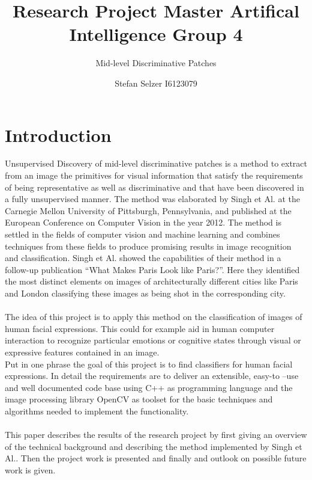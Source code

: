 \documentclass[%
   final,      %
   paper=a4,%
   paper=portrait, %
   pagesize=auto, %
   fontsize=10pt,%
   version=last, %
 ]{scrartcl} %
\title{Research Project Master Artifical Intelligence Group 4}
\subtitle{Mid-level Discriminative Patches}
\author{Stefan Selzer I6123079}
\begin{document}
\maketitle

\newpage
\tableofcontents
\newpage
\section{Introduction}\label{sec:Introduction}
Unsupervised Discovery of mid-level discriminative patches is a method to extract from an image the primitives for visual information that satisfy the requirements of being representative as well as discriminative and that have been discovered in a fully unsupervised manner. The method was elaborated by Singh et Al. at the Carnegie Mellon University of Pittsburgh, Pennsylvania, and published at the European Conference on Computer Vision in the year 2012.\cite[Singh2012]{Singh2012DiscPat} The method is settled in the fields of computer vision and machine learning and combines techniques from these fields to produce promising results in image recognition and classification. Singh et Al. showed the capabilities of their method in a follow-up publication “What Makes Paris Look like Paris?”.\cite[Doersch2012]{doersch2012what} Here they identified the most distinct elements on images of architecturally different cities like Paris and London classifying these images as being shot in the corresponding city.
\\
\\
The idea of this project is to apply this method on the classification of images of human facial expressions. This could for example aid in human computer interaction to recognize particular emotions or cognitive states through visual or expressive features contained in an image.
\\
Put in one phrase the goal of this project is to find classifiers for human facial expressions.
In detail the requirements are to deliver an extensible, easy-to –use and well documented code base using C++ as programming language and the image processing library OpenCV as toolset for the basic techniques and algorithms needed to implement the functionality.
\\
\\
This paper describes the results of the research project by first giving an overview of the technical background and describing the method implemented by Singh et Al.. Then the project work is presented and finally and outlook on possible future work is given.
\end{document}
